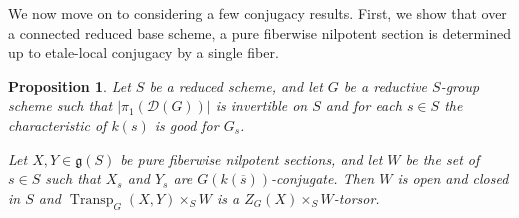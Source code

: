 \documentclass[11pt,reqno]{amsart}
\newtheorem{prop}[theorem]{Proposition}
\theoremstyle{definition}
\newcommand{\sD}{{\mathscr D}}
\newcommand{\fg}{\mathfrak{g}}
\DeclareMathOperator{\Transp}{Transp}
\begin{document}
We now move on to considering a few conjugacy results. First, we show that over a connected reduced base scheme, a pure fiberwise nilpotent section is determined up to etale-local conjugacy by a single fiber.

\begin{prop}\label{prop:pure-sections-determined-by-one-fiber}
Let $S$ be a reduced scheme, and let $G$ be a reductive $S$-group scheme such that $|\pi_1(\sD(G))|$ is invertible on $S$ and for each $s \in S$ the characteristic of $k(s)$ is good for $G_s$.\smallskip

Let $X, Y \in \fg(S)$ be pure fiberwise nilpotent sections, and let $W$ be the set of $s \in S$ such that $X_s$ and $Y_s$ are $G(k(\overline{s}))$-conjugate. Then $W$ is open and closed in $S$ and $\Transp_G(X, Y) \times_S W$ is a $Z_G(X) \times_S W$-torsor.
\end{prop}
\end{document}
